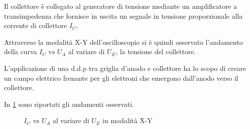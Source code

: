 Il collettore è collegato al generatore di tensione mediante un amplificatore a transimpedenza
	che fornisce in uscita un segnale in tensione proporzionale alla corrente di collettore $I_C$.

	Attraverso la modalità X-Y dell'oscilloscopio si è quindi
	osservato l'andamento della curva $I_C \text{ vs } U_A$ al
	variare di $U_E$, la tensione del collettore.
	
	L'applicazione di una d.d.p tra griglia d'anodo e collettore ha lo scopo di creare un campo elettrico frenante per gli elettroni che emergono dall'anodo verso il collettore.
	
	In \figurename{ \ref{fig:ue}} sono riportati gli andamenti osservati.
	
\begin{figure}[h!]
		\centering
		\caption{$I_C$ vs $U_A$ al variare di $U_E$ in modalità X-Y}
	\label{fig:ue}
\end{figure}
